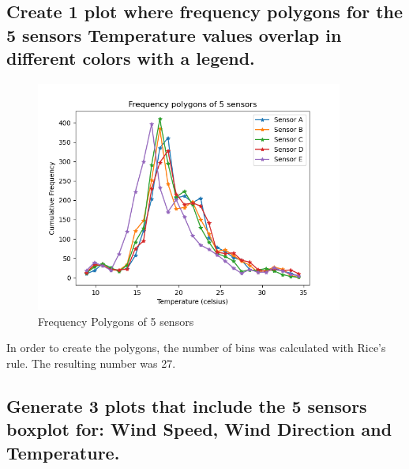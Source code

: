\documentclass[a4paper,12pt]{article} %
\begin{document}
\subsection {Create 1 plot where frequency polygons for the 5 sensors Temperature values overlap in different colors with a legend.}

\begin{figure}[H] %
	\centering %
	\includegraphics[width=0.9\textwidth]{Figure_3.png} 
	\caption{Frequency Polygons of 5 sensors} %
\end{figure}

In order to create the polygons, the number of bins was calculated with Rice's rule. The resulting number was 27.

\subsection {Generate 3 plots that include the 5 sensors boxplot for: Wind Speed, Wind Direction and Temperature.}
\end{document}
